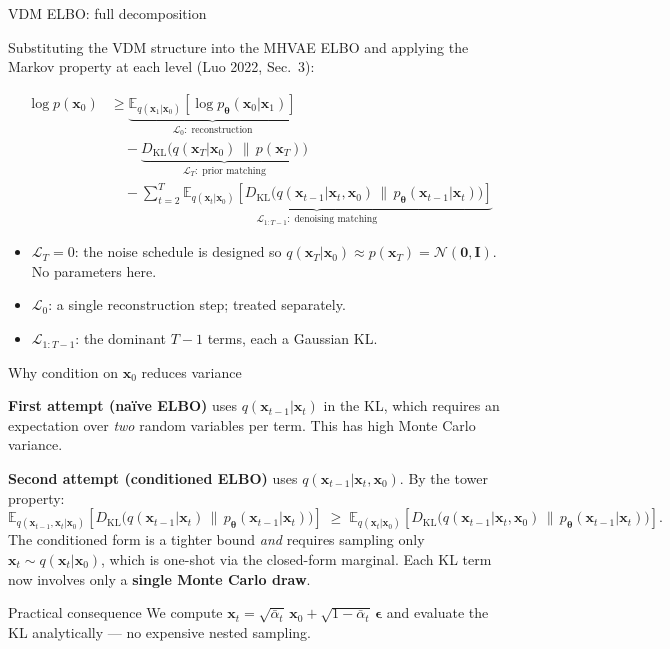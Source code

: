 \documentclass[aspectratio=169,11pt]{beamer}
\newcommand{\E}{\mathbb{E}}
\newcommand{\DKL}{D_{\mathrm{KL}}}
\newcommand{\Norm}{\mathcal{N}}
\newcommand{\bx}{\bm{x}}
\newcommand{\beps}{\bm{\epsilon}}
\newcommand{\btheta}{\bm{\theta}}
\begin{document}
\begin{frame}{VDM ELBO: full decomposition}

Substituting the VDM structure into the MHVAE ELBO and applying
the Markov property at each level (Luo 2022, Sec.\ 3):

\begin{align*}
\log p(\bx_0)
&\geq
\underbrace{\E_{q(\bx_1|\bx_0)}
  \!\left[\log p_{\btheta}(\bx_0|\bx_1)\right]}_{\mathcal{L}_0:\;\text{reconstruction}}\\
&\quad
-\underbrace{\DKL\!\bigl(q(\bx_T|\bx_0)\,\|\,p(\bx_T)\bigr)}_{\mathcal{L}_T:\;\text{prior matching}}\\
&\quad
-\underbrace{\sum_{t=2}^{T}\E_{q(\bx_t|\bx_0)}\!
  \left[\DKL\!\bigl(q(\bx_{t-1}|\bx_t,\bx_0)\,\|\,
               p_{\btheta}(\bx_{t-1}|\bx_t)\bigr)\right]}_{\mathcal{L}_{1:T-1}:\;\text{denoising matching}}
\end{align*}

\begin{itemize}
  \item $\mathcal{L}_T = 0$: the noise schedule is designed so
        $q(\bx_T|\bx_0)\approx p(\bx_T)=\Norm(\bm{0},\mathbf{I})$. No parameters here.
  \item $\mathcal{L}_0$: a single reconstruction step; treated separately.
  \item $\mathcal{L}_{1:T-1}$: the dominant $T-1$ terms, each a Gaussian KL.
\end{itemize}
\end{frame}

\begin{frame}{Why condition on $\bx_0$ reduces variance}

\textbf{First attempt (naïve ELBO)} uses $q(\bx_{t-1}|\bx_t)$ in the KL,
which requires an expectation over \emph{two} random variables per term.
This has high Monte Carlo variance.

\medskip
\textbf{Second attempt (conditioned ELBO)} uses $q(\bx_{t-1}|\bx_t,\bx_0)$.
By the tower property:
\[
  \E_{q(\bx_{t-1},\bx_t|\bx_0)}\!\left[
    \DKL\!\bigl(q(\bx_{t-1}|\bx_t)\,\|\,p_{\btheta}(\bx_{t-1}|\bx_t)\bigr)\right]
  \;\geq\;
  \E_{q(\bx_t|\bx_0)}\!\left[
    \DKL\!\bigl(q(\bx_{t-1}|\bx_t,\bx_0)\,\|\,p_{\btheta}(\bx_{t-1}|\bx_t)\bigr)\right].
\]
The conditioned form is a tighter bound \emph{and} requires sampling only
$\bx_t\sim q(\bx_t|\bx_0)$, which is one-shot via the closed-form marginal.
Each KL term now involves only a \textbf{single Monte Carlo draw}.

\begin{alertblock}{Practical consequence}
We compute $\bx_t = \sqrt{\bar\alpha_t}\,\bx_0 + \sqrt{1-\bar\alpha_t}\,\beps$
and evaluate the KL analytically — no expensive nested sampling.
\end{alertblock}
\end{frame}
\end{document}
